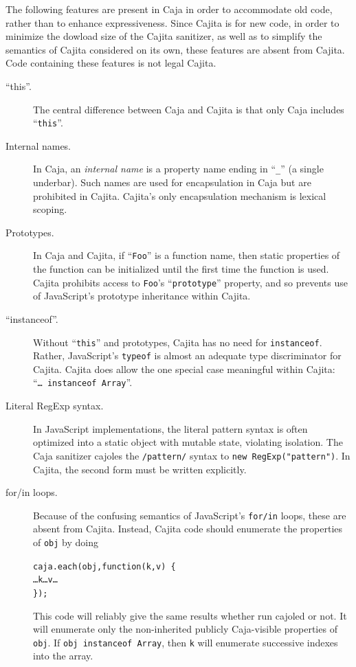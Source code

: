 \documentclass[letterpaper,twocolumn,10pt]{article}
\newcommand{\code}[1]{{\tt {#1}}}              %
\begin{document}
The following features are present in Caja in order to accommodate old code, 
rather than to enhance expressiveness. Since Cajita is for new code, in order 
to minimize the dowload size of the Cajita sanitizer, as well as to simplify 
the semantics of Cajita considered on its own, these features are absent from 
Cajita. Code containing these features is not legal Cajita.

\begin{description}
    
    \item[``this''.] The central difference between Caja and Cajita is that 
    only Caja includes ``\code{this}''.
    
    \item[Internal names.] In Caja, an \emph{internal name} is a property 
    name ending in ``\code{\_}'' (a single underbar). Such names are used for 
    encapsulation in Caja but are prohibited in Cajita. Cajita's only 
    encapsulation mechanism is lexical scoping.
    
    \item[Prototypes.] In Caja and Cajita, if ``\code{Foo}'' is a function 
    name, then static properties of the function can be initialized until the 
    first time the function is used. Cajita prohibits access to \code{Foo}'s 
    ``\code{prototype}'' property, and so prevents use of JavaScript's 
    prototype inheritance within Cajita.
    
    \item[``instanceof''.] Without ``\code{this}'' and prototypes, Cajita has 
    no need for \code{instanceof}. Rather, JavaScript's \code{typeof} is 
    almost an adequate type discriminator for Cajita. Cajita does allow the 
    one special case meaningful within Cajita: ``\code{{\ldots}\ instanceof 
    Array}''.
    
    \item[Literal RegExp syntax.] In JavaScript implementations, the literal 
    pattern syntax is often optimized into a static object with mutable 
    state, violating isolation. The Caja sanitizer cajoles the 
    \code{/pattern/} syntax to \code{new RegExp("pattern")}. In Cajita, the 
    second form must be written explicitly.
    
    \item[for/in loops.] Because of the confusing semantics of JavaScript's 
    \code{for/in} loops, these are absent from Cajita. Instead, Cajita code 
    should enumerate the properties of \code{obj} by doing
%
\begin{alltt}
caja.each(obj, function(k, v)\ \{
  {\ldots}k{\ldots}v{\ldots}
\});
\end{alltt}
%
    This code will reliably give the same results whether run cajoled or not. 
    It will enumerate only the non-inherited publicly Caja-visible properties 
    of \code{obj}. If \code{obj instanceof Array}, then \code{k} will 
    enumerate successive indexes into the array.
    

\end{description}
\end{document}
